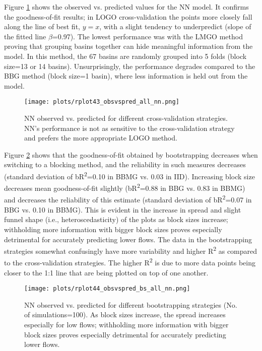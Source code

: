 Figure \ref{fig:obsprednn} shows the observed vs. predicted values for the NN model. It confirms the goodness-of-fit results; in LOGO cross-validation the points more closely fall along the line of best fit, $y=x$, with a slight tendency to underpredict (slope of the fitted line $\beta$=0.97). The lowest performance was with the LMGO method proving that grouping basins together can hide meaningful information from the model. In this method, the 67 basins are randomly grouped into 5 folds (block size=13 or 14 basins). Unsurprisingly, the performance degrades compared to the BBG method (block size=1 basin), where less information is held out from the model. 

\begin{figure}
	\centering
 	\texttt{[image: plots/rplot43\_obsvspred\_all\_nn.png]}
  	\caption[NN observed vs. predicted for different cross-validation strategies.]{NN observed vs. predicted for different cross-validation strategies. NN's performance is not as sensitive to the cross-validation strategy and prefers the more appropriate LOGO method.}
  	\label{fig:obsprednn}
\end{figure}

Figure \ref{fig:obsprednnbs} shows that the goodness-of-fit obtained by bootstrapping decreases when switching to a blocking method, and the reliability in such measures decreases (standard deviation of bR\textsuperscript{2}=0.10 in BBMG vs. 0.03 in IID). Increasing block size decreases mean goodness-of-fit slightly (bR\textsuperscript{2}=0.88 in BBG vs. 0.83 in BBMG) and decreases the reliability of this estimate (standard deviation of bR\textsuperscript{2}=0.07 in BBG vs. 0.10 in BBMG). This is evident in the increase in spread and slight funnel shape (i.e., heteroscedasticity) of the plots as block sizes increase; withholding more information with bigger block sizes proves especially detrimental for accurately predicting lower flows. The data in the bootstrapping strategies somewhat confusingly have more variability and higher R\textsuperscript{2} as compared to the cross-validation strategies. The higher R\textsuperscript{2} is due to more data points being closer to the 1:1 line that are being plotted on top of one another. 


\begin{figure}
	\centering
 	\texttt{[image: plots/rplot44\_obsvspred\_bs\_all\_nn.png]}
  	\caption[NN observed vs. predicted for different bootstrapping strategies.]{NN observed vs. predicted for different bootstrapping strategies (No. of simulations=100). As block sizes increase, the spread increases especially for low flows; withholding more information with bigger block sizes proves especially detrimental for accurately predicting lower flows.}
  	\label{fig:obsprednnbs}
\end{figure}

